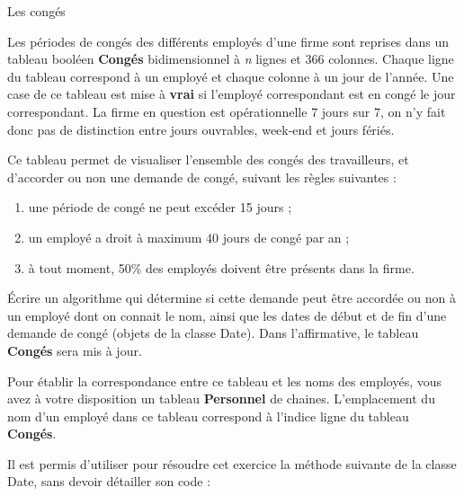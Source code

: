 \begin{Exercice}{Les congés}

	Les périodes de congés des différents employés d’une firme sont reprises
	dans un tableau booléen \textbf{Congés} bidimensionnel à \textit{n}
	lignes et 366 colonnes. Chaque ligne du tableau correspond à un employé
	et chaque colonne à un jour de l’année. Une case de ce tableau est mise
	à \textbf{vrai} si l’employé correspondant est en congé le jour
	correspondant. La firme en question est opérationnelle 7 jours sur 7,
	on n’y fait donc pas de distinction entre jours ouvrables, week-end et
	jours fériés.

	Ce tableau permet de visualiser l’ensemble des congés des travailleurs,
	et d’accorder ou non une demande de congé, suivant les règles suivantes :
	\begin{enumerate}
		\item 
			une période de congé ne peut excéder 15 jours ;
		\item 
			un employé a droit à maximum 40 jours de congé par an ;
		\item 
			à tout moment, 50\% des employés doivent être présents dans la firme.
	\end{enumerate}
	
	Écrire un algorithme qui détermine si cette demande peut être accordée
	ou non à un employé dont on connait le nom, ainsi que les dates de
	début et de fin d’une demande de congé (objets de la classe Date). Dans
	l’affirmative, le tableau \textbf{Congés} sera mis à jour.

	Pour établir la correspondance entre ce tableau et les noms des
	employés, vous avez à votre disposition un tableau \textbf{Personnel}
	de chaines. L’emplacement du nom d’un employé dans ce tableau
	correspond à l’indice ligne du tableau \textbf{Congés}.

	Il est permis d’utiliser pour résoudre cet exercice la méthode suivante
	de la classe Date, sans devoir détailler son code :
	
	\begin{algo}
	\end{algo}
\end{Exercice}

